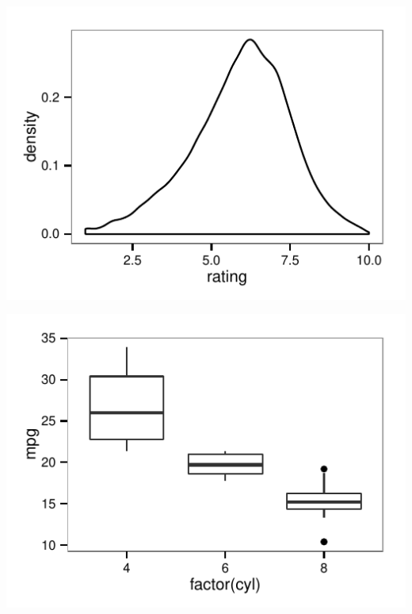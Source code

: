 \documentclass[twoside]{article}\usepackage[]{graphicx}\usepackage[]{color}
\makeatletter
\def\maxwidth{ %
  \ifdim\Gin@nat@width>\linewidth
    \linewidth
  \else
    \Gin@nat@width
  \fi
}
\newenvironment{knitrout}{}{} %
\makeatother
\begin{document}
\begin{multicols}{2}
\begin{knitrout}
\color{fgcolor}
\includegraphics[width=\maxwidth]{figure/test_plot_two1} 

\includegraphics[width=\maxwidth]{figure/test_plot_two2} 

\end{knitrout}


\lipsum[1-5]







\end{multicols}
\end{document}
